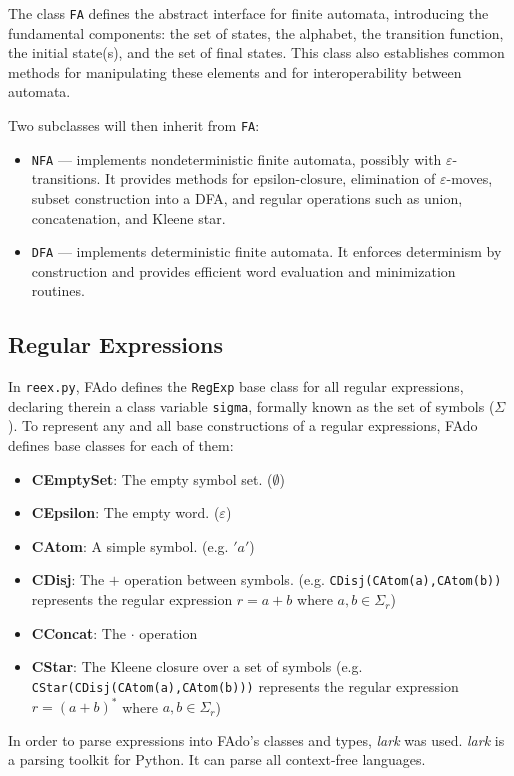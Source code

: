 


The class \texttt{FA} defines the abstract interface for finite automata, introducing the fundamental components: the set of states, the alphabet, the transition function, the initial state(s), and the set of final states. This class also establishes common methods for manipulating these elements and for interoperability between automata.

Two subclasses will then inherit from \texttt{FA}:
\begin{itemize}
	\item \texttt{NFA} --- implements nondeterministic finite automata, possibly with $\varepsilon$-transitions. It provides methods for epsilon-closure, elimination of $\varepsilon$-moves, subset construction into a DFA, and regular operations such as union, concatenation, and Kleene star.
	\item \texttt{DFA} --- implements deterministic finite automata. It enforces determinism by construction and provides efficient word evaluation and minimization routines.
\end{itemize}

\subsection{Regular Expressions}
In \texttt{reex.py}, FAdo defines the \texttt{RegExp} base class for all regular expressions, declaring therein a class variable \texttt{sigma}, formally known as the set of symbols ($\Sigma$).
To represent any and all base constructions of a regular expressions, FAdo defines base classes for each of them:
\begin{itemize}
    \item \textbf{CEmptySet}: The empty symbol set. ($\emptyset$)
    \item \textbf{CEpsilon}: The empty word. ($\varepsilon$)
    \item \textbf{CAtom}: A simple symbol. (e.g. $'a'$)
    \item \textbf{CDisj}: The $+$ operation between symbols. (e.g. \texttt{CDisj(CAtom(a),CAtom(b))} represents the regular expression $r=a+b$ where $a,b \in \Sigma_r$)
    \item \textbf{CConcat}: The $\cdot$ operation 
    \item \textbf{CStar}: The Kleene closure over a set of symbols (e.g. \texttt{CStar(CDisj(CAtom(a),CAtom(b)))} represents the regular expression $r=(a+b)^*$ where $a,b \in \Sigma_r$)

\end{itemize}

In order to parse expressions into FAdo's classes and types, \emph{lark} was used. \emph{lark} is a parsing toolkit for Python. It can parse all context-free languages.